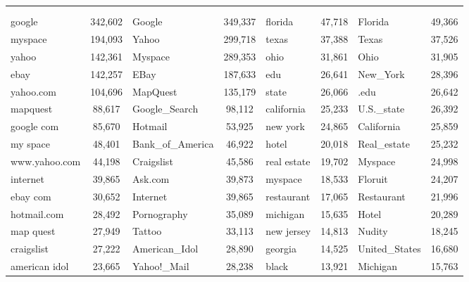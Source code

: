 \begin{figure}
	\footnotesize
	\centering
\begin{tabular}{lc|lc|lc|lc}
\toprule
\multicolumn{4}{c}{\head{}} & \multicolumn{4}{c}{\tail{}}\\
\multicolumn{2}{c}{\shead{}} & \multicolumn{2}{c}{\ehead{}} & \multicolumn{2}{c}{\stail{}} & \multicolumn{2}{c}{\etail{}}\\
\midrule
google         & 342,602  &  Google  		   & 349,337  &  florida 	 &	47,718	&	Florida 		& 49,366 \\
myspace        & 194,093  &  Yahoo\!  		   & 299,718  &  texas  	 &	 37,388  &   Texas   		& 37,526 \\
yahoo          & 142,361  &  Myspace 		   & 289,353  &  ohio    	 &	31,861   &   Ohio    		& 31,905 \\			
ebay           & 142,257  &   EBay   		   & 187,633  &  edu     	 &	26,641   &   New\_York        & 28,396 \\
yahoo.com      & 104,696  &  MapQuest          & 135,179  &  state   	 &	26,066   &   .edu    		& 26,642 \\
mapquest       & 88,617   &  Google\_Search     & 98,112   &  california  &   25,233  &   U.S.\_state      & 26,392 \\
google com     & 85,670   &  Hotmail           & 53,925   &  new york    &   24,865  &   California      & 25,859 \\
my space       & 48,401   &	  Bank\_of\_America  & 46,922   &  hotel   	 &	20,018   &   Real\_estate     & 25,232 \\
www.yahoo.com  & 44,198   &  Craigslist        & 45,586   &  real estate &   19,702  &   Myspace 		& 24,998 \\
internet       & 39,865   &  Ask.com           & 39,873   &  myspace 	 &	18,533   &   Floruit 		& 24,207 \\
ebay com       & 30,652   &  Internet          & 39,865   &  restaurant  &  17,065   &   Restaurant      & 21,996 \\
hotmail.com    & 28,492   &  Pornography       & 35,089   &  michigan    &   15,635  &   Hotel   		& 20,289 \\
map quest      & 27,949   &  Tattoo            & 33,113   &  new jersey  &   14,813  &   Nudity  		& 18,245 \\
craigslist     & 27,222   &  American\_Idol     & 28,890   &  georgia 	 &	14,525   &   United\_States   & 16,680 \\
american idol  & 23,665   &  Yahoo!\_Mail       & 28,238   &  black   	 &	13,921   &   Michigan        & 15,763 \\
\bottomrule
\end{tabular}
\end{figure}





